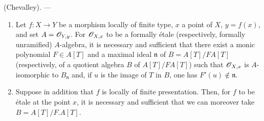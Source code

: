 \begin{theorem}[18.4.6]
\label{IV.18.4.6}
(Chevalley). ---
\begin{enumerate}
  \item[\textup{(i)}] Let $f:X\to Y$ be a morphism locally of finite type, $x$ a point of $X$, $y=f(x)$, and set $A=\mathscr{O}_{Y,y}$.
For $\mathscr{O}_{X,x}$ to be a formally \'etale \textup{(respectively,} formally unramified\textup{)} $A$-algebra, it is necessary and sufficient that there exist a monic polynomial $F\in A[T]$ and a maximal ideal $\mathfrak{n}$ of $B=A[T]/F A[T]$ \textup{(respectively,} of a quotient algebra $B$ of $A[T]/F A[T]$\textup{)} such that $\mathscr{O}_{X,x}$ is $A$-isomorphic to $B_\mathfrak{n}$ and, if $u$ is the image of $T$ in $B$, one has $F'(u)\notin\mathfrak{n}$.
  \item[\textup{(ii)}] Suppose in addition that $f$ is locally of finite presentation.
Then, for $f$ to be \'etale at the point $x$, it is necessary and sufficient that we can moreover take $B=A[T]/F.A[T]$.
\end{enumerate}
\end{theorem}

